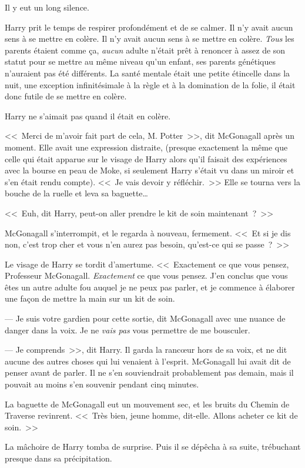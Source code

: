 Il y eut un long silence.

Harry prit le temps de respirer profondément et de se calmer. Il n'y avait aucun sens à se mettre en colère. Il n'y avait aucun sens à se mettre en colère. \emph{Tous} les parents étaient comme ça, \emph{aucun} adulte n'était prêt à renoncer à assez de son statut pour se mettre au même niveau qu'un enfant, ses parents génétiques n'auraient pas été différents. La santé mentale était une petite étincelle dans la nuit, une exception infinitésimale à la règle et à la domination de la folie, il était donc futile de se mettre en colère.

Harry ne s'aimait pas quand il était en colère.

<<~Merci de m'avoir fait part de cela, M. Potter~>>, dit McGonagall après un moment. Elle avait une expression distraite, (presque exactement la même que celle qui était apparue sur le visage de Harry alors qu'il faisait des expériences avec la bourse en peau de Moke, si seulement Harry s'était vu dans un miroir et s'en était rendu compte). <<~Je vais devoir y réfléchir.~>> Elle se tourna vers la bouche de la ruelle et leva sa baguette…

<<~Euh, dit Harry, peut-on aller prendre le kit de soin maintenant~?~>>

McGonagall s'interrompit, et le regarda à nouveau, fermement. <<~Et si je dis non, c'est trop cher et vous n'en aurez pas besoin, qu'est-ce qui se passe~?~>>

Le visage de Harry se tordit d'amertume.
<<~Exactement ce que vous pensez, Professeur McGonagall. \emph{Exactement} ce que vous pensez. J'en conclus que vous êtes un autre adulte fou auquel je ne peux pas parler, et je commence à élaborer une façon de mettre la main sur un kit de soin.

--- Je suis votre gardien pour cette sortie, dit McGonagall avec une nuance de danger dans la voix. Je ne \emph{vais pas} vous permettre de me bousculer.

--- Je comprends~>>, dit Harry. Il garda la rancœur hors de sa voix, et ne dit aucune des autres choses qui lui venaient à l'esprit. McGonagall lui avait dit de penser avant de parler. Il ne s'en souviendrait probablement pas demain, mais il pouvait au moins s'en souvenir pendant cinq minutes.

La baguette de McGonagall eut un mouvement sec, et les bruits du Chemin de Traverse revinrent. <<~Très bien, jeune homme, dit-elle. Allons acheter ce kit de soin.~>>

La mâchoire de Harry tomba de surprise. Puis il se dépêcha à sa suite, trébuchant presque dans sa précipitation.

